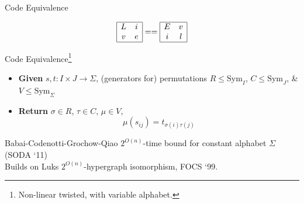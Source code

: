 \documentclass{beamer}
\begin{document}
\begin{frame}[fragile]{Code Equivalence}

\[\begin{array}{|cc|}
    \hline 
L & i \\ v & e \\
\hline
\end{array}
== 
\begin{array}{|cc|}
    \hline 
E & v \\ i & l \\
\hline
\end{array}\]
\begin{block}{Code Equivalence\footnote{Non-linear twisted, with variable alphabet.}}
\begin{minipage}{0.6\textwidth}
\begin{itemize}
    \item {\color{csugreen}\textbf{Given}} $s,t:I\times J\to \Sigma$, 
    (generators for) permutations 
    $R\leq \mathrm{Sym}_{I}$, 
    $C\leq \mathrm{Sym}_J$, 
    \& $V\leq \mathrm{Sym}_{\Sigma}$ 
    \item {\color{csugreen}\textbf{Return}}  $\sigma\in R$, $\tau\in C$, $\mu\in V$,
    \[\mu(s_{ij}) = t_{\sigma(i)\tau(j)}\] 
\end{itemize}
\end{minipage}
\hfill
\begin{minipage}{0.3\textwidth}
\end{minipage}

\end{block}

Babai-Codenotti-Grochow-Qiao $2^{O(n)}$-time bound for constant alphabet $\Sigma$ (SODA `11) \\
Builds on Luks $2^{O(n)}$-hypergraph isomorphism, FOCS `99.

\end{frame}
\end{document}
